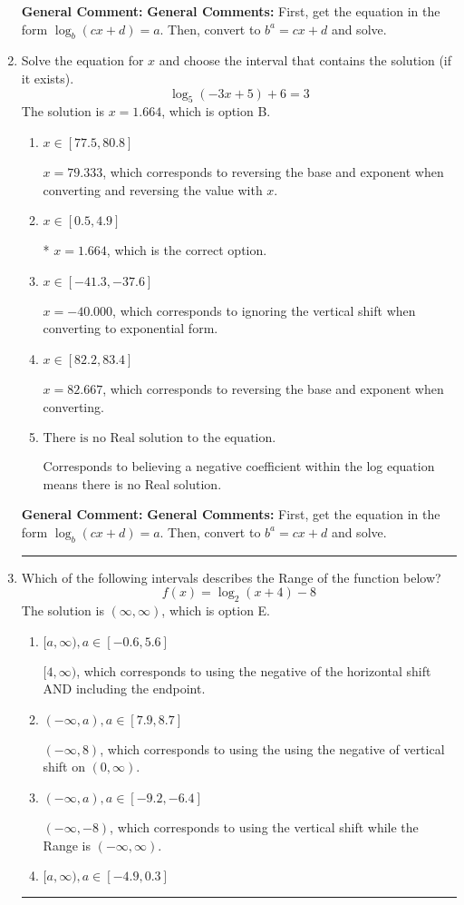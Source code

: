 \documentclass{extbook}[14pt]
\newcommand{\litem}[1]{\item #1

\rule{\textwidth}{0.4pt}}
\begin{document}
\begin{enumerate}
{\textbf{General Comment:} \textbf{General Comments:} First, get the equation in the form $\log_b{(cx+d)} = a$. Then, convert to $b^a = cx+d$ and solve.
}
\litem{
Solve the equation for $x$ and choose the interval that contains the solution (if it exists).
\[ \log_{5}{(-3x+5)}+6 = 3 \]
The solution is \( x = 1.664 \), which is option B.\begin{enumerate}[label=\Alph*.]
\item \( x \in [77.5, 80.8] \)

$x = 79.333$, which corresponds to reversing the base and exponent when converting and reversing the value with $x$.
\item \( x \in [0.5, 4.9] \)

* $x = 1.664$, which is the correct option.
\item \( x \in [-41.3, -37.6] \)

$x = -40.000$, which corresponds to ignoring the vertical shift when converting to exponential form.
\item \( x \in [82.2, 83.4] \)

$x = 82.667$, which corresponds to reversing the base and exponent when converting.
\item \( \text{There is no Real solution to the equation.} \)

Corresponds to believing a negative coefficient within the log equation means there is no Real solution.
\end{enumerate}

\textbf{General Comment:} \textbf{General Comments:} First, get the equation in the form $\log_b{(cx+d)} = a$. Then, convert to $b^a = cx+d$ and solve.
}
\litem{
Which of the following intervals describes the Range of the function below?
\[ f(x) = \log_2{(x+4)}-8 \]
The solution is \( (\infty, \infty) \), which is option E.\begin{enumerate}[label=\Alph*.]
\item \( [a, \infty), a \in [-0.6, 5.6] \)

$[4, \infty)$, which corresponds to using the negative of the horizontal shift AND including the endpoint.
\item \( (-\infty, a), a \in [7.9, 8.7] \)

$(-\infty, 8)$, which corresponds to using the using the negative of vertical shift on $(0, \infty)$.
\item \( (-\infty, a), a \in [-9.2, -6.4] \)

$(-\infty, -8)$, which corresponds to using the vertical shift while the Range is $(-\infty, \infty)$.
\item \( [a, \infty), a \in [-4.9, 0.3] \)


\end{enumerate}}
\end{enumerate}
\end{document}
